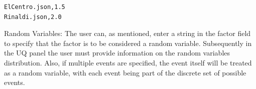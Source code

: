 \begin{verbatim}
ElCentro.json,1.5
Rinaldi.json,2.0
\end{verbatim}

Random Variables: The user can, as mentioned, enter a string in the
factor field to specify that the factor is to be considered a random
variable. Subsequently in the UQ panel the user must provide
information on the random variables distribution. Also, if multiple
events are specified, the event itself will be treated as a random
variable, with each event being part of the discrete set of possible
events.
